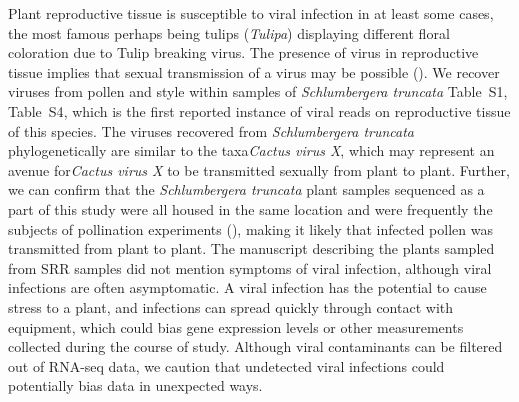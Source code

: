 \documentclass[fleqn,10pt,lineno]{wlpeerj}
\begin{document}
{Plant reproductive tissue is susceptible to viral infection in at least some cases, the most famous perhaps being tulips (\textit{Tulipa}) displaying different floral coloration due to Tulip breaking virus.
The presence of virus in reproductive tissue implies that sexual transmission of a virus may be possible (\citealt{Kim_2015}).
We recover viruses from pollen and style within samples of \textit{Schlumbergera truncata} {Table~S1, Table~S4}, which is the first reported instance of viral reads on reproductive tissue of this species.
The viruses recovered from \textit{Schlumbergera truncata} phylogenetically are similar to the taxa\textit{Cactus virus X}, which may represent an avenue for\textit{Cactus virus X} to be transmitted sexually from plant to plant.
Further, we can confirm that the \textit{Schlumbergera truncata} plant samples sequenced as a part of this study were all housed in the same location and were frequently the subjects of pollination experiments (\citealt{ramanauskas2021}), making it likely that infected pollen was transmitted from plant to plant.
The manuscript describing the plants sampled from SRR samples did not mention symptoms of viral infection, although viral infections are often asymptomatic.
A viral infection has the potential to cause stress to a plant, and infections can spread quickly through contact with equipment, which could bias gene expression levels or other measurements collected during the course of study.
Although viral contaminants can be filtered out of RNA-seq data, we caution that undetected viral infections could potentially bias data in unexpected ways.

}
\end{document}
